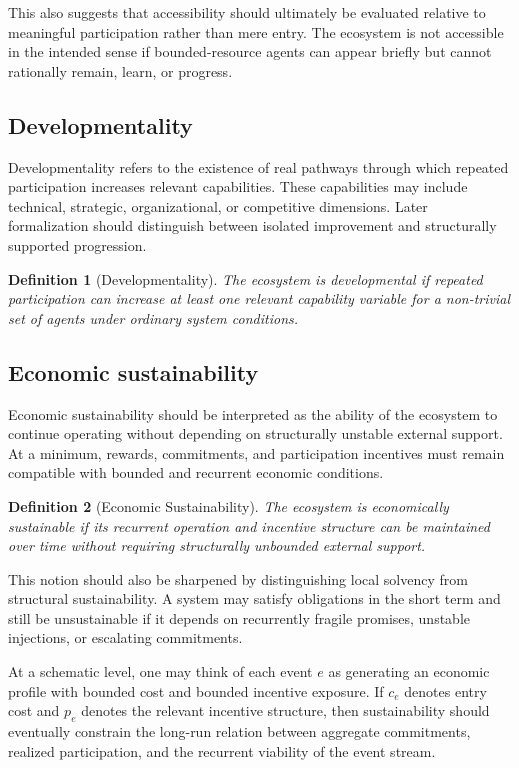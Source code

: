 \documentclass[11pt]{article}
\newtheorem{definition}{Definition}
\begin{document}
This also suggests that accessibility should ultimately be evaluated relative to meaningful participation rather than mere entry. The ecosystem is not accessible in the intended sense if bounded-resource agents can appear briefly but cannot rationally remain, learn, or progress.

\subsection{Developmentality}

Developmentality refers to the existence of real pathways through which repeated participation increases relevant capabilities. These capabilities may include technical, strategic, organizational, or competitive dimensions. Later formalization should distinguish between isolated improvement and structurally supported progression.

\begin{definition}[Developmentality]
The ecosystem is developmental if repeated participation can increase at least one relevant capability variable for a non-trivial set of agents under ordinary system conditions.
\end{definition}

\subsection{Economic sustainability}

Economic sustainability should be interpreted as the ability of the ecosystem to continue operating without depending on structurally unstable external support. At a minimum, rewards, commitments, and participation incentives must remain compatible with bounded and recurrent economic conditions.

\begin{definition}[Economic Sustainability]
The ecosystem is economically sustainable if its recurrent operation and incentive structure can be maintained over time without requiring structurally unbounded external support.
\end{definition}

This notion should also be sharpened by distinguishing local solvency from structural sustainability. A system may satisfy obligations in the short term and still be unsustainable if it depends on recurrently fragile promises, unstable injections, or escalating commitments.

At a schematic level, one may think of each event \(e\) as generating an economic profile with bounded cost and bounded incentive exposure. If \(c_e\) denotes entry cost and \(p_e\) denotes the relevant incentive structure, then sustainability should eventually constrain the long-run relation between aggregate commitments, realized participation, and the recurrent viability of the event stream.
\end{document}
